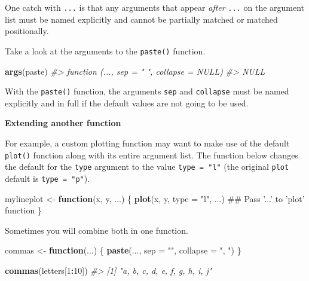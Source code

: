 \documentclass[]{book}
\newenvironment{Shaded}{\begin{snugshade}}{\end{snugshade}}
\newcommand{\KeywordTok}[1]{\textcolor[rgb]{0.13,0.29,0.53}{\textbf{#1}}}
\newcommand{\DataTypeTok}[1]{\textcolor[rgb]{0.13,0.29,0.53}{#1}}
\newcommand{\DecValTok}[1]{\textcolor[rgb]{0.00,0.00,0.81}{#1}}
\newcommand{\StringTok}[1]{\textcolor[rgb]{0.31,0.60,0.02}{#1}}
\newcommand{\CommentTok}[1]{\textcolor[rgb]{0.56,0.35,0.01}{\textit{#1}}}
\newcommand{\ControlFlowTok}[1]{\textcolor[rgb]{0.13,0.29,0.53}{\textbf{#1}}}
\newcommand{\OperatorTok}[1]{\textcolor[rgb]{0.81,0.36,0.00}{\textbf{#1}}}
\newcommand{\NormalTok}[1]{#1}
\begin{document}
One catch with \texttt{...} is that any arguments that appear
\emph{after} \texttt{...} on the argument list must be named explicitly
and cannot be partially matched or matched positionally.

Take a look at the arguments to the \texttt{paste()} function.

\begin{Shaded}
\begin{Highlighting}[]
\KeywordTok{args}\NormalTok{(paste)}
\CommentTok{#> function (..., sep = " ", collapse = NULL) }
\CommentTok{#> NULL}
\end{Highlighting}
\end{Shaded}

With the \texttt{paste()} function, the arguments \texttt{sep} and
\texttt{collapse} must be named explicitly and in full if the default
values are not going to be used.

\textbf{Extending another function}

For example, a custom plotting function may want to make use of the
default \texttt{plot()} function along with its entire argument list.
The function below changes the default for the \texttt{type} argument to
the value \texttt{type\ =\ "l"} (the original \texttt{plot} default is
\texttt{type\ =\ "p"}).

\begin{Shaded}
\begin{Highlighting}[]
\NormalTok{mylineplot <-}\StringTok{ }\ControlFlowTok{function}\NormalTok{(x, y, ...) \{}
        \KeywordTok{plot}\NormalTok{(x, y, }\DataTypeTok{type =} \StringTok{"l"}\NormalTok{, ...)         ## Pass '...' to 'plot' function}
\NormalTok{\}}
\end{Highlighting}
\end{Shaded}

Sometimes you will combine both in one function.

\begin{Shaded}
\begin{Highlighting}[]
\NormalTok{commas <-}\StringTok{ }\ControlFlowTok{function}\NormalTok{(...) \{}
  \KeywordTok{paste}\NormalTok{(..., }\DataTypeTok{sep =} \StringTok{""}\NormalTok{, }\DataTypeTok{collapse =} \StringTok{", "}\NormalTok{)}
\NormalTok{\}}

\KeywordTok{commas}\NormalTok{(letters[}\DecValTok{1}\OperatorTok{:}\DecValTok{10}\NormalTok{])}
\CommentTok{#> [1] "a, b, c, d, e, f, g, h, i, j"}
\end{Highlighting}
\end{Shaded}
\end{document}
